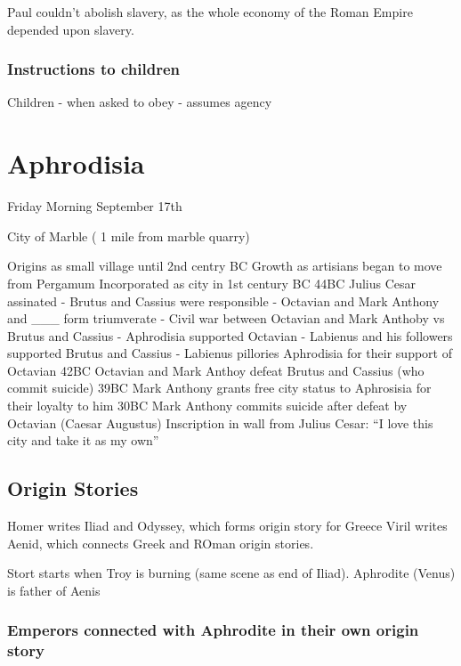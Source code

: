 \documentclass[
]{book}
\begin{document}
Paul couldn't abolish slavery, as the whole economy of the Roman Empire depended upon slavery.

\hypertarget{instructions-to-children}{%
\subsection{Instructions to children}\label{instructions-to-children}}

Children - when asked to obey - assumes agency

\hypertarget{aphrodisia}{%
\chapter{Aphrodisia}\label{aphrodisia}}

Friday Morning September 17th

City of Marble ( 1 mile from marble quarry)

Origins as small village until 2nd centry BC
Growth as artisians began to move from Pergamum
Incorporated as city in 1st century BC
44BC Julius Cesar assinated
- Brutus and Cassius were responsible
- Octavian and Mark Anthony and \_\_\_ form triumverate
- Civil war between Octavian and Mark Anthoby vs Brutus and Cassius
- Aphrodisia supported Octavian
- Labienus and his followers supported Brutus and Cassius
- Labienus pillories Aphrodisia for their support of Octavian
42BC Octavian and Mark Anthoy defeat Brutus and Cassius (who commit suicide)
39BC Mark Anthony grants free city status to Aphrosisia for their loyalty to him
30BC Mark Anthony commits suicide after defeat by Octavian (Caesar Augustus)
Inscription in wall from Julius Cesar: ``I love this city and take it as my own''

\hypertarget{origin-stories}{%
\section{Origin Stories}\label{origin-stories}}

Homer writes Iliad and Odyssey, which forms origin story for Greece
Viril writes Aenid, which connects Greek and ROman origin stories.

Stort starts when Troy is burning (same scene as end of Iliad).
Aphrodite (Venus) is father of Aenis

\hypertarget{emperors-connected-with-aphrodite-in-their-own-origin-story}{%
\subsection{Emperors connected with Aphrodite in their own origin story}\label{emperors-connected-with-aphrodite-in-their-own-origin-story}}
\end{document}
